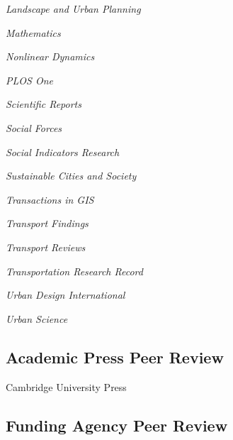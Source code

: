 \documentclass[12pt,letterpaper]{report}
\newcommand{\listitemspace}{0.15em}
\renewenvironment{itemize}
{\begin{list}{}{\setlength{\leftmargin}{0em}
            \setlength{\parskip}{0em}
            \setlength{\itemsep}{\listitemspace}
            \setlength{\parsep}{\listitemspace}}}
    {\end{list}}
\begin{document}
\begin{itemize}
        \item \textit{Landscape and Urban Planning}

        \item \textit{Mathematics}

        \item \textit{Nonlinear Dynamics}

        \item \textit{PLOS One}
        
        \item \textit{Scientific Reports}
        
        \item \textit{Social Forces}
        
        \item \textit{Social Indicators Research}

        \item \textit{Sustainable Cities and Society}

        \item \textit{Transactions in GIS}

        \item \textit{Transport Findings}
        
        \item \textit{Transport Reviews}
        
        \item \textit{Transportation Research Record}

        \item \textit{Urban Design International}

        \item \textit{Urban Science}

    \end{itemize}

	\subsection*{Academic Press Peer Review}
	
	\begin{itemize}
		
		\item Cambridge University Press
		
	\end{itemize}

    \subsection*{Funding Agency Peer Review}
\end{document}
